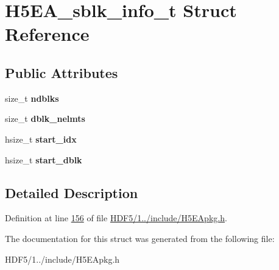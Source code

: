 \hypertarget{struct_h5_e_a__sblk__info__t}{}\section{H5\+E\+A\+\_\+sblk\+\_\+info\+\_\+t Struct Reference}
\label{struct_h5_e_a__sblk__info__t}
\subsection*{Public Attributes}
\begin{DoxyCompactItemize}
\item 
\mbox{\label{struct_h5_e_a__sblk__info__t_aa42c6bc080dd7e3e812f925b5bb53dda}} 
size\+\_\+t {\bfseries ndblks}
\item 
\mbox{\label{struct_h5_e_a__sblk__info__t_a4e5d422569d4efa9ed0291e56defc191}} 
size\+\_\+t {\bfseries dblk\+\_\+nelmts}
\item 
\mbox{\label{struct_h5_e_a__sblk__info__t_a64914358c9ad3dd7b1e87ecd42647122}} 
hsize\+\_\+t {\bfseries start\+\_\+idx}
\item 
\mbox{\label{struct_h5_e_a__sblk__info__t_a23e2bfbfe04c7878ae44890ea9d16341}} 
hsize\+\_\+t {\bfseries start\+\_\+dblk}
\end{DoxyCompactItemize}


\subsection{Detailed Description}


Definition at line \hyperlink{_h_d_f5_21_810_81_2include_2_h5_e_apkg_8h_source_l00156}{156} of file \hyperlink{_h_d_f5_21_810_81_2include_2_h5_e_apkg_8h_source}{H\+D\+F5/1../include/\+H5\+E\+Apkg.\+h}.



The documentation for this struct was generated from the following file\+:\begin{DoxyCompactItemize}
\item 
H\+D\+F5/1../include/\+H5\+E\+Apkg.\+h\end{DoxyCompactItemize}
